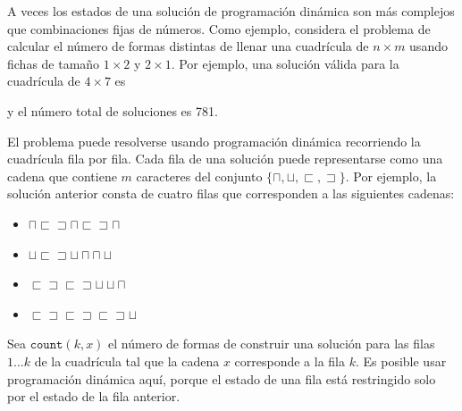 A veces los estados de una solución de programación dinámica
son más complejos que combinaciones fijas de números.
Como ejemplo,
considera el problema de calcular
el número de formas distintas de
llenar una cuadrícula de $n \times m$ usando
fichas de tamaño $1 \times 2$ y $2 \times 1$.
Por ejemplo, una solución válida
para la cuadrícula de $4 \times 7$ es
\begin{center}
\end{center}
y el número total de soluciones es 781.

El problema puede resolverse usando programación dinámica
recorriendo la cuadrícula fila por fila.
Cada fila de una solución puede representarse como una
cadena que contiene $m$ caracteres del conjunto
$\{\sqcap, \sqcup, \sqsubset, \sqsupset \}$.
Por ejemplo, la solución anterior consta de cuatro filas
que corresponden a las siguientes cadenas:
\begin{itemize}
\item
$\sqcap \sqsubset \sqsupset \sqcap \sqsubset \sqsupset \sqcap$
\item
$\sqcup \sqsubset \sqsupset \sqcup \sqcap \sqcap \sqcup$
\item
$\sqsubset \sqsupset \sqsubset \sqsupset \sqcup \sqcup \sqcap$
\item
$\sqsubset \sqsupset \sqsubset \sqsupset \sqsubset \sqsupset \sqcup$
\end{itemize}

Sea $\texttt{count}(k,x)$ el número de formas de
construir una solución para las filas $1 \ldots k$
de la cuadrícula tal que la cadena $x$ corresponde a la fila $k$.
Es posible usar programación dinámica aquí,
porque el estado de una fila está restringido
solo por el estado de la fila anterior.

